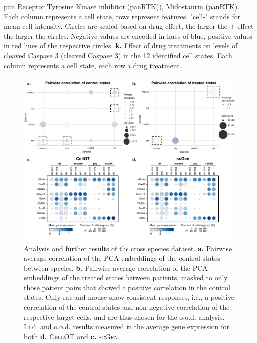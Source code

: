{pan Receptor Tyrosine Kinase inhibitor (panRTK)), Midostaurin (panRTK). Each column represents a cell state, rows represent features. "cell-" stands for mean cell intensity. Circles are scaled based on drug effect, the larger the $\pm$ effect the larger the circles. Negative values are encoded in hues of blue, positive values in red hues of the respective circles. \textbf{k.} Effect of drug treatments on levels of cleaved Caspase 3 (cleaved Caspase 3) in the 12 identified cell states. Each column represents a cell state, each row a drug treatment.}
\label{fig:4i_analysis_extended}

\newpage
\begin{figure}[p]
     \centering
     \includegraphics[width=\textwidth]{figures/fig_crossspecies_ood_analysis.pdf}
     \caption{ Analysis and further results of the cross species dataset. \textbf{a.} Pairwise average correlation of the PCA embeddings of the control states between species. \textbf{b.} Pairwise average correlation of the PCA embeddings of the treated states between patients, masked to only those patient pairs that showed a positive correlation in the control states. Only rat and mouse show consistent responses, i.e., a positive correlation of the control states and non-negative correlation of the respective target cells, and are thus chosen for the o.o.d. analysis. I.i.d. and o.o.d. results measured in the average gene expression for both \textbf{d.} \textsc{CellOT} and \textbf{c.} \textsc{scGen}.}
     \label{fig:crossspecies_ood_analysis}
\end{figure}

